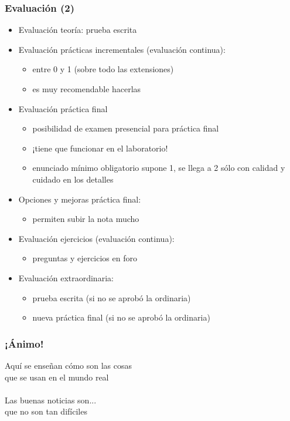 
\begin{frame}
\frametitle{Evaluación (2)}

\begin{itemize}
\item Evaluación teoría: prueba escrita
\item Evaluación prácticas incrementales (evaluación continua):
      \begin{itemize}
      \item entre 0 y 1 (sobre todo las extensiones)
      \item es muy recomendable hacerlas
      \end{itemize}
\item Evaluación práctica final
      \begin{itemize}
      \item posibilidad de examen presencial para práctica final
      \item ¡tiene que funcionar en el laboratorio!
      \item enunciado mínimo obligatorio supone 1, se llega a 2 sólo con calidad y cuidado en los detalles
      \end{itemize}
\item Opciones y mejoras práctica final:
      \begin{itemize}
      \item permiten subir la nota mucho
      \end{itemize}
\item Evaluación ejercicios (evaluación continua):
      \begin{itemize}
      \item preguntas y ejercicios en foro
      \end{itemize}
\item Evaluación extraordinaria:
  \begin{itemize}
  \item prueba escrita (si no se aprobó la ordinaria)
  \item nueva práctica final (si no se aprobó la ordinaria)
  \end{itemize}
\end{itemize}

\end{frame}


\begin{frame}
\frametitle{¡Ánimo!}

\begin{center}
{\huge Aquí se enseñan cómo son las cosas \\
  que se usan en el mundo real \\
  ~ \\
  Las buenas noticias son... \\
  que no son tan difíciles\\}
\end{center}

\end{frame}


